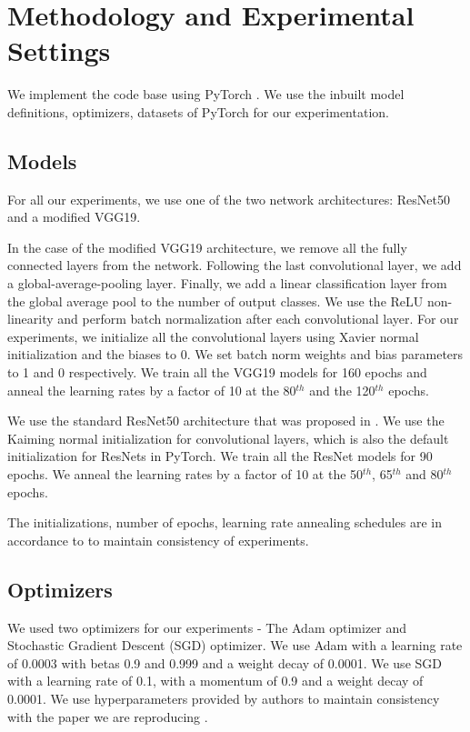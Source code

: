 \documentclass{article}
\begin{document}
\section{Methodology and Experimental Settings}
\label{sec:method}
We implement the code base using PyTorch \cite{pytorch}. We use the inbuilt model definitions, optimizers, datasets of PyTorch for our experimentation.

\subsection{Models}
\label{subsec:models}
For all our experiments, we use one of the two network  architectures: ResNet50 and a modified VGG19. 

In the case of the modified VGG19 architecture, we remove all the fully connected layers from the network. Following the last convolutional layer, we add a global-average-pooling layer. Finally, we add a linear classification layer from the global average pool to the number of output classes. We use the ReLU non-linearity and perform batch normalization after each convolutional layer. For our experiments, we initialize all the convolutional layers using Xavier normal initialization and the biases to 0. We set batch norm weights and bias parameters to 1 and 0 respectively. We train all the VGG19 models for 160 epochs and anneal the learning rates
by a factor of 10 at the 80$^{th}$ and the 120$^{th}$ epochs. 

We use the standard ResNet50 architecture that was proposed in \cite{DBLP:journals/corr/HeZRS15}. We use the Kaiming normal initialization for convolutional layers, which is also the default initialization for ResNets in PyTorch. We train all the ResNet models for 90 epochs. We anneal the learning rates by a factor of 10 at the 50$^{th}$, 65$^{th}$ and 80$^{th}$ epochs. 

The initializations, number of epochs, learning rate annealing schedules are in accordance to \cite{repro_paper} to maintain consistency of experiments.

\subsection{Optimizers}
We used two optimizers for our experiments - The Adam optimizer and Stochastic Gradient Descent (SGD) optimizer. We use Adam with a learning rate of 0.0003 with betas 0.9 and 0.999 and a weight decay of 0.0001. We use SGD with a learning rate of 0.1, with a momentum of 0.9 and a weight decay of 0.0001. We use hyperparameters provided by authors to maintain consistency with the paper we are reproducing \cite{repro_paper}.
\end{document}
